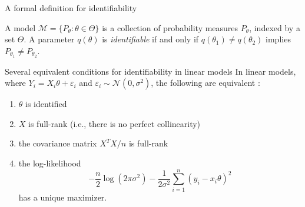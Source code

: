 \documentclass[aspectratio=169]{beamer}
\theoremstyle{remark}
\begin{document}
\appendix


\begin{frame}{A formal definition for identifiability}
    \begin{definition}
        A model $\mathcal M = \{ P_\theta : \theta \in \Theta \}$ is a collection of probability measures $P_\theta$, indexed by a set $\Theta$. A parameter $q(\theta)$ is \emph{identifiable} if and only if $q(\theta_1) \neq q(\theta_2)$ implies $P_{\theta_1} \neq P_{\theta_2}$.
    \end{definition}
\end{frame}

\begin{frame}{Several equivalent conditions for identifiability in linear models}
    In linear models, where $Y_i = X_i \theta + \varepsilon_i$ and $\varepsilon_i \sim \mathcal N(0, \sigma^2)$, the following are equivalent \citep{lewbel2019}:
    \begin{enumerate}
        \item $\theta$ is identified
        \item $X$ is full-rank (i.e., there is no perfect collinearity)
        \item the covariance matrix $X^T X / n$ is full-rank
        \item the log-likelihood
              \[
                  -\frac{n}{2}\log(2\pi\sigma^2) - \frac{1}{2\sigma^2}\sum_{i=1}^n(y_i - x_i\theta)^2
              \]
              has a unique maximizer.
    \end{enumerate}
\end{frame}
\end{document}
